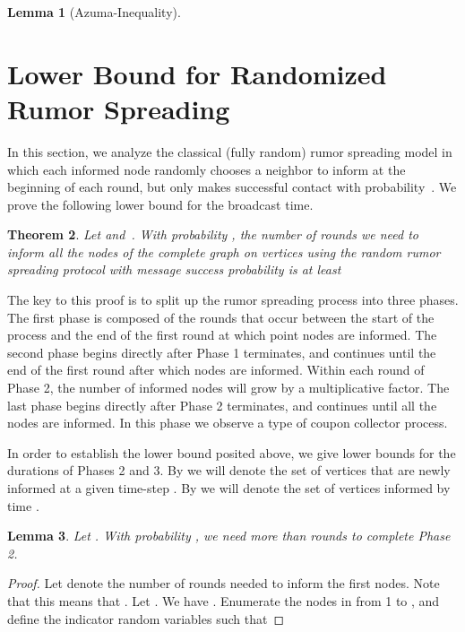 \documentclass[12pt]{article}
\newtheorem{theorem}{Theorem}
\newtheorem{lemma}[theorem]{Lemma}
\begin{document}
{\begin{lemma}[Azuma-Inequality]
\end{lemma}

\section{Lower Bound for Randomized Rumor Spreading}\label{sec:lower}


In this section, we analyze the classical (fully random) rumor spreading model in which each informed node randomly chooses a neighbor to inform at the beginning of each round, but only makes successful contact with probability~. We prove the following lower bound for the broadcast time.

\begin{theorem}
 Let  and~. With probability , the number of rounds we need to inform all the nodes of the complete graph on  vertices using the random rumor spreading protocol with message success probability  is at least



\end{theorem}

The key to this proof is to split up the rumor spreading process into three phases. The first phase is composed of the rounds that occur between the start of the process and the end of the first round at which point  nodes are informed. The second phase begins directly after Phase 1 terminates, and continues until the end of the first round after which  nodes are informed. Within each round of Phase 2, the number of informed nodes will grow by a multiplicative factor. The last phase begins directly after Phase 2 terminates, and continues until all the nodes are informed. In this phase we observe a type of coupon collector process.

In order to establish the lower bound posited above, we give lower bounds for the durations of Phases 2 and 3. 
By  we will denote the set of vertices that are newly informed at a given time-step . 
By  we will denote the set of vertices informed by time .


\begin{lemma}\label{RandomPhase2}
Let . With probability , we need more than  rounds to complete Phase 2.
\end{lemma}

\begin{proof}
Let  denote the number of rounds needed to inform the first  nodes. Note that this means that . Let . We have . Enumerate the nodes in  from 1 to , and define the indicator random variables  such that





\end{proof}}
\end{document}
